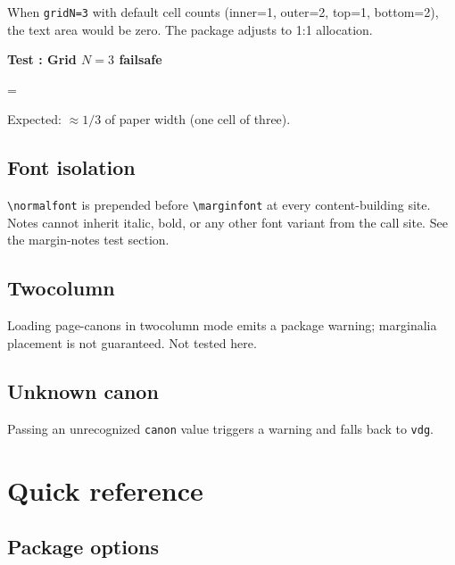 \documentclass[11pt, twoside, openany]{book}
\newcommand{\showlen}[2]{\noindent\texttt{#1} = \the#2\par}
\newcommand{\pkg}[1]{\textsf{#1}}
\newcommand{\cmd}[1]{\texttt{\textbackslash #1}}
\newcounter{testnum}
\newcommand{\test}[1]{%
  \stepcounter{testnum}%
  \par\medskip\noindent
  \textbf{Test \thetestnum: #1}\par\smallskip}
\begin{document}
When \texttt{gridN=3} with default cell counts (inner=1, outer=2, top=1, bottom=2), the text area would be zero. The package adjusts to 1:1 allocation.

\test{Grid $N=3$ failsafe}


\showlen{\string\textwidth}{\textwidth}

Expected: $\approx 1/3$ of paper width (one cell of three).


\section{Font isolation}\label{sec:isolation}

\cmd{normalfont} is prepended before \cmd{marginfont} at every content-building site. Notes cannot inherit italic, bold, or any other font variant from the call site. See the margin-notes test section.

\section{Twocolumn}\label{sec:twocolumn}

Loading \pkg{page-canons} in twocolumn mode emits a package warning; marginalia placement is not guaranteed. Not tested here.

\section{Unknown canon}\label{sec:unknown}

Passing an unrecognized \texttt{canon} value triggers a warning and falls back to \texttt{vdg}.


\chapter{Quick reference}\label{chapter:quickreference}

\section{Package options}\label{sec:options}
\end{document}

